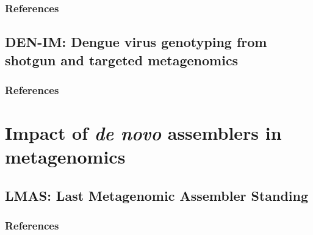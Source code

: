 \documentclass[12pt,a4paper,twoside,openright]{book}
\begin{document}
\begin{sloppy}
\thispagestyle{empty}
\clearpage \thispagestyle{empty}\mbox{}\clearpage
\newpage
\begin{refsection}

\newpage
\section{References}
\printbibliography[heading=none]
\end{refsection}

\newpage
\thispagestyle{empty}
\chapter{DEN-IM: Dengue virus genotyping from shotgun and targeted metagenomics\label{ch:paper3}}

\thispagestyle{empty}
\clearpage \thispagestyle{empty}\mbox{}\clearpage
\newpage
\begin{refsection}

\newpage
\section{References}
\printbibliography[heading=none]
\end{refsection}

\part{Impact of \textit{de novo} assemblers in metagenomics}
\newpage
\thispagestyle{empty}
\chapter{LMAS: Last Metagenomic Assembler Standing\label{ch:paper4}}

\thispagestyle{empty}
\clearpage \thispagestyle{empty}\mbox{}\clearpage
\newpage
\begin{refsection}

\newpage
\section{References}
\printbibliography[heading=none]
\end{refsection}


\end{sloppy}
\end{document}

